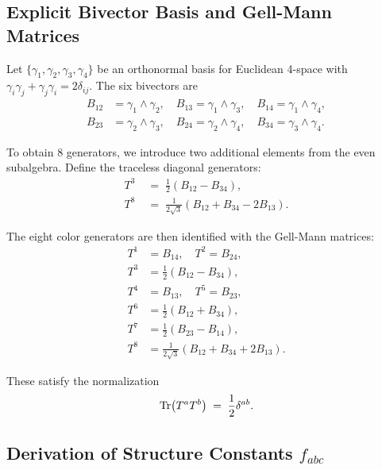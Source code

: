 \documentclass[11pt,a4paper]{article}
\theoremstyle{definition}
\theoremstyle{plain}
\theoremstyle{remark}
\begin{document}
\subsection{Explicit Bivector Basis and Gell-Mann Matrices}

Let $\{\gamma_1, \gamma_2, \gamma_3, \gamma_4\}$ be an orthonormal basis for Euclidean 4-space with $\gamma_i \gamma_j + \gamma_j \gamma_i = 2\delta_{ij}$. The six bivectors are
\begin{equation}
\begin{aligned}
B_{12} &= \gamma_1 \wedge \gamma_2, \quad B_{13} = \gamma_1 \wedge \gamma_3, \quad B_{14} = \gamma_1 \wedge \gamma_4, \\
B_{23} &= \gamma_2 \wedge \gamma_3, \quad B_{24} = \gamma_2 \wedge \gamma_4, \quad B_{34} = \gamma_3 \wedge \gamma_4.
\end{aligned}
\label{eq:bivector-basis-6d}
\end{equation}

To obtain 8 generators, we introduce two additional elements from the even subalgebra. Define the traceless diagonal generators:
\begin{align}
T^3 &\;=\; \frac{1}{2}(B_{12} - B_{34}), \\
T^8 &\;=\; \frac{1}{2\sqrt{3}}(B_{12} + B_{34} - 2B_{13}).
\end{align}

The eight color generators are then identified with the Gell-Mann matrices:
\begin{align}
T^1 &= B_{14}, \quad T^2 = B_{24}, \nonumber \\
T^3 &= \frac{1}{2}(B_{12} - B_{34}), \nonumber \\
T^4 &= B_{13}, \quad T^5 = B_{23}, \nonumber \\
T^6 &= \frac{1}{2}(B_{12} + B_{34}), \nonumber \\
T^7 &= \frac{1}{2}(B_{23} - B_{14}), \nonumber \\
T^8 &= \frac{1}{2\sqrt{3}}(B_{12} + B_{34} + 2B_{13}).
\label{eq:color-generators}
\end{align}

These satisfy the normalization
\begin{equation}
\Tr(T^a T^b) \;=\; \frac{1}{2}\delta^{ab}.
\end{equation}

\subsection{Derivation of Structure Constants $f_{abc}$}
\end{document}
